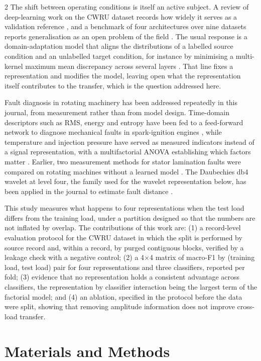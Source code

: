 \documentclass[12pt,twoside,titlepage]{ingenius}
\begin{document}
\begin{multicols}{2}
The shift between operating conditions is itself an active subject. A review of
deep-learning work on the CWRU dataset records how widely it serves as a
validation reference \cite{neupane2020}, and a benchmark of four architectures
over nine datasets reports generalisation as an open problem of the field
\cite{zhao2020}. The usual response is a domain-adaptation model that aligns the
distributions of a labelled source condition and an unlabelled target condition,
for instance by minimising a multi-kernel maximum mean discrepancy across
several layers \cite{li2019}. That line fixes a representation and modifies the
model, leaving open what the representation itself contributes to the transfer,
which is the question addressed here.

Fault diagnosis in rotating machinery has been addressed repeatedly in this
journal, from measurement rather than from model design. Time-domain descriptors
such as RMS, energy and entropy have been fed to a feed-forward network to
diagnose mechanical faults in spark-ignition engines \cite{contreras2019}, while
temperature and injection pressure have served as measured indicators instead of
a signal representation, with a multifactorial ANOVA establishing which factors
matter \cite{llanes2019}. Earlier, two measurement methods for stator lamination
faults were compared on rotating machines without a learned model
\cite{salazar2012}. The Daubechies db4 wavelet at level four, the family used
for the wavelet representation below, has been applied in the journal to
estimate fault distance \cite{gomez2023}.

This study measures what happens to four representations when the test load
differs from the training load, under a partition designed so that the numbers
are not inflated by overlap. The contributions of this work are: (1) a
record-level evaluation protocol for the CWRU dataset in which the split is
performed by source record and, within a record, by purged contiguous blocks,
verified by a leakage check with a negative control; (2) a 4$\times$4 matrix of
macro-F1 by (training load, test load) pair for four representations and three
classifiers, reported per fold; (3) evidence that no representation holds a
consistent advantage across classifiers, the representation by classifier
interaction being the largest term of the factorial model; and (4) an ablation,
specified in the protocol before the data were split, showing that removing
amplitude information does not improve cross-load transfer.

\section{Materials and Methods}


\end{multicols}
\end{document}
